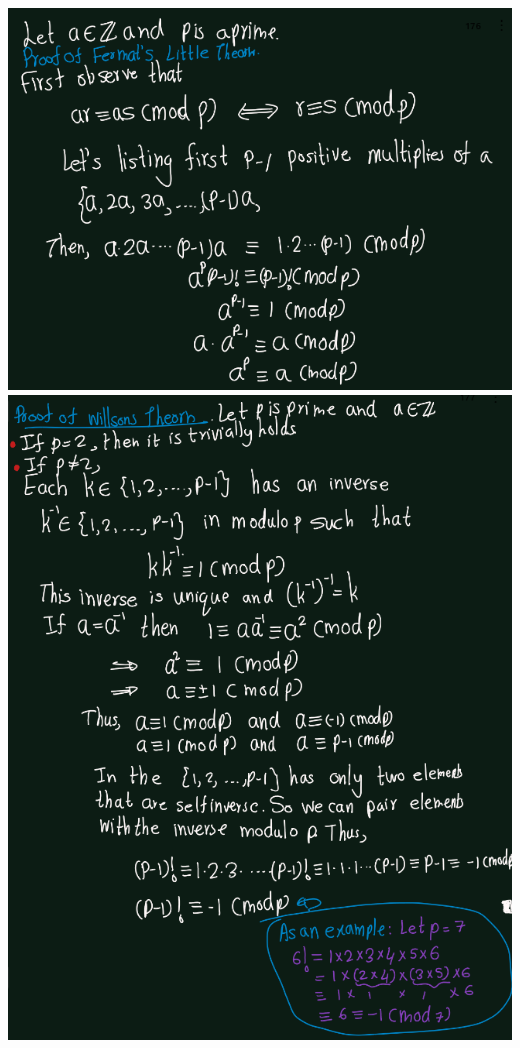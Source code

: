 \documentclass[
]{book}
\theoremstyle{definition}
\theoremstyle{definition}
\theoremstyle{definition}
\theoremstyle{definition}
\theoremstyle{remark}
\begin{document}
\includegraphics{figures/ch_3/ex-1.8-1.png}
\includegraphics{figures/ch_3/ex-1.8-2.png}
\end{document}
